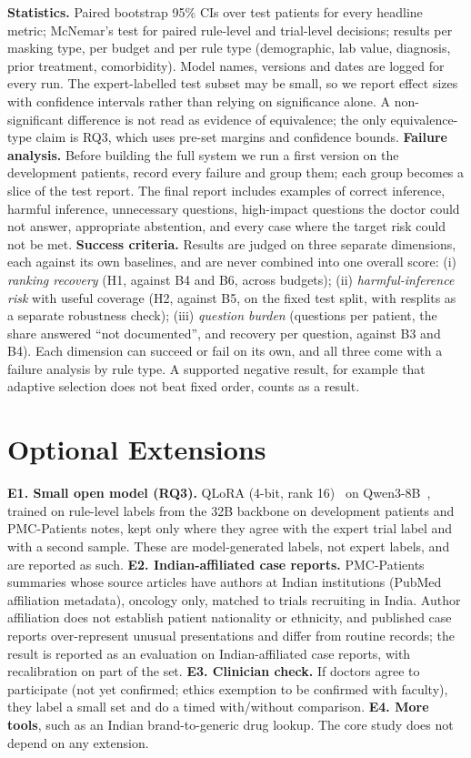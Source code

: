 \documentclass[10pt,a4paper]{article}
\begin{document}
\textbf{Statistics.} Paired bootstrap 95\% CIs over test patients for every headline metric; McNemar's test for paired rule-level and trial-level decisions; results per masking type, per budget and per rule type (demographic, lab value, diagnosis, prior treatment, comorbidity). Model names, versions and dates are logged for every run. The expert-labelled test subset may be small, so we report effect sizes with confidence intervals rather than relying on significance alone. A non-significant difference is not read as evidence of equivalence; the only equivalence-type claim is RQ3, which uses pre-set margins and confidence bounds. \textbf{Failure analysis.} Before building the full system we run a first version on the development patients, record every failure and group them; each group becomes a slice of the test report. The final report includes examples of correct inference, harmful inference, unnecessary questions, high-impact questions the doctor could not answer, appropriate abstention, and every case where the target risk could not be met. \textbf{Success criteria.} Results are judged on three separate dimensions, each against its own baselines, and are never combined into one overall score: (i) \emph{ranking recovery} (H1, against B4 and B6, across budgets); (ii) \emph{harmful-inference risk} with useful coverage (H2, against B5, on the fixed test split, with resplits as a separate robustness check); (iii) \emph{question burden} (questions per patient, the share answered ``not documented'', and recovery per question, against B3 and B4). Each dimension can succeed or fail on its own, and all three come with a failure analysis by rule type. A supported negative result, for example that adaptive selection does not beat fixed order, counts as a result.

\section{Optional Extensions}
\textbf{E1. Small open model (RQ3).} QLoRA (4-bit, rank 16)~\cite{qlora} on Qwen3-8B~\cite{qwen3}, trained on rule-level labels from the 32B backbone on development patients and PMC-Patients notes, kept only where they agree with the expert trial label and with a second sample. These are model-generated labels, not expert labels, and are reported as such. \textbf{E2. Indian-affiliated case reports.} PMC-Patients summaries whose source articles have authors at Indian institutions (PubMed affiliation metadata), oncology only, matched to trials recruiting in India. Author affiliation does not establish patient nationality or ethnicity, and published case reports over-represent unusual presentations and differ from routine records; the result is reported as an evaluation on Indian-affiliated case reports, with recalibration on part of the set. \textbf{E3. Clinician check.} If doctors agree to participate (not yet confirmed; ethics exemption to be confirmed with faculty), they label a small set and do a timed with/without comparison. \textbf{E4. More tools}, such as an Indian brand-to-generic drug lookup. The core study does not depend on any extension.
\end{document}
